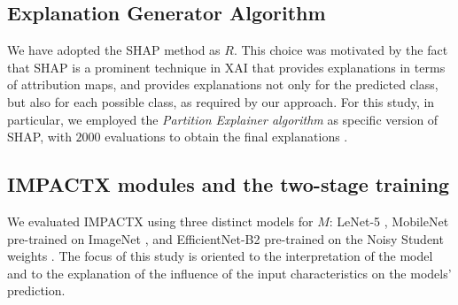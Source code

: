 \subsection{Explanation Generator Algorithm}
We have adopted the SHAP method \citep{NIPS2017_7062} as $R$. This choice was motivated by the fact that SHAP is a  prominent technique in XAI that provides explanations in terms of attribution maps, and provides explanations not only for the predicted class, but also for each possible class, as required by our approach. 
For this study, in particular, we employed the \textit{Partition Explainer algorithm} as specific version of SHAP, with $2000$ evaluations to obtain the final explanations \citep{NIPS2017_7062}. 


\subsection{IMPACTX modules and the two-stage training}
\label{subsec:AdoptedModelsTraining}
We evaluated IMPACTX using three distinct models for $M$: LeNet-5 \citep{lecun1998gradient}, MobileNet \citep{howard2017mobilenets} pre-trained on ImageNet \citep{deng2009imagenet}, and  EfficientNet-B2 \citep{tan2019efficientnet} pre-trained on the Noisy Student weights \citep{xie2020self}. 
The focus of this study is oriented
to the interpretation of the model and to the explanation
of the influence of the input characteristics on the models’
prediction. %

